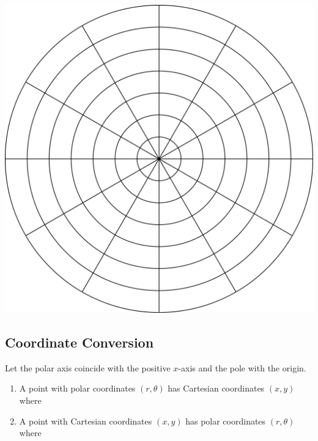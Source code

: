 \documentclass[12pt]{article}
\begin{document}
\begin{center}
\includegraphics[scale=0.25]{coordinate_plane.png}
\end{center}


\subsection*{Coordinate Conversion}

Let the polar axis coincide with the positive $x$-axis and the pole with the origin.

\vfill

\begin{enumerate}
\item[\tc{1}] A point with polar coordinates $(r,\theta)$ has Cartesian coordinates $(x,y)$ where

\vspace{12mm}

\item[\tc{2}] A point with Cartesian coordinates $(x,y)$ has polar coordinates $(r,\theta)$ where 

\vspace{12mm}

\end{enumerate}
\end{document}
